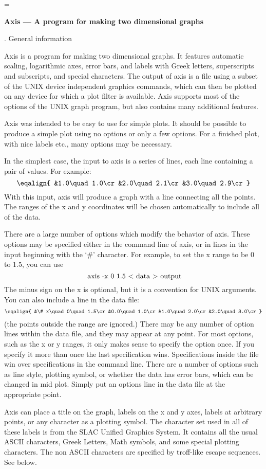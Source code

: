 \magnification=
\parskip=3pt

\centerline{\bf Axis --- A program for making two dimensional graphs}
\bigskip
{}. General information

Axis is a program for making two dimensional graphs.  It features
automatic scaling, logarithmic axes, error bars, and labels with Greek
letters, superscripts and subscripts, and special characters. The output
of axis is a file using a subset of the UNIX device independent graphics
commands, which can then be plotted on any device for which a plot
filter is available.  Axis supports most of the options of the UNIX
graph program, but also contains many additional features.

Axis was intended to be easy to use for simple plots.  It should be
possible to produce a simple plot using no options or only a few
options.  For a finished plot, with nice labels etc., many options may
be necessary.

In the simplest case, the input to axis is a series of lines, each line
containing a pair of values. For example:
$$\eqalign{
&1.0\quad   1.0\cr
&2.0\quad   2.1\cr
&3.0\quad   2.9\cr
}$$
With this input, axis will produce a graph with a line connecting all
the points.  The ranges of the x and y coordinates will be chosen
automatically to include all of the data.

There are a large number of options which modify the behavior of axis.
These options may be specified either in the command line of axis, or in
lines in the input beginning with the `\#' character. For example, to
set the x range to be 0 to 1.5, you can use
$$\hbox{ axis  -x  0  1.5  $<$  data  $>$  output}$$
The minus sign on the x is optional, but it is a convention for UNIX
arguments. You can also include a line in the data file:
$$\eqalign{
&\# x\quad 0\quad 1.5\cr
&0.0\quad  1.0\cr
&1.0\quad  2.0\cr
&2.0\quad  3.0\cr
}$$
(the points outside the range are ignored.) There may be any number of
option lines within the data file, and they may appear at any point.
For most options, such as the x or y ranges, it only makes sense to
specify the option once.  If you specify it more than once the last
specification wins.  Specifications inside the file win over
specifications in the command line. There are a number of options such
as line style, plotting symbol, or whether the data has error bars,
which can be changed in mid plot. Simply put an options line in the data
file at the appropriate point.

Axis can place a title on the graph, labels on the x and y axes, labels
at arbitrary points, or any character as a plotting symbol.  The
character set used in all of these labels is from the SLAC Unified
Graphics System.  It contains all the usual ASCII characters, Greek
Letters, Math symbols, and some special plotting characters.  The non
ASCII characters are specified by troff-like escape sequences. See
below.

